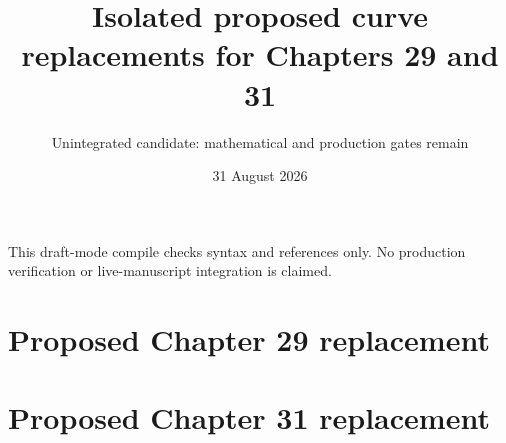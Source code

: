 \documentclass[11pt]{article}
\title{Isolated proposed curve replacements for Chapters 29 and 31}
\author{Unintegrated candidate: mathematical and production gates remain}
\date{31 August 2026}
\begin{document}
\maketitle
\noindent This draft-mode compile checks syntax and references only.
No production verification or live-manuscript integration is claimed.

\section*{Proposed Chapter 29 replacement}

\section*{Proposed Chapter 31 replacement}



\end{document}
